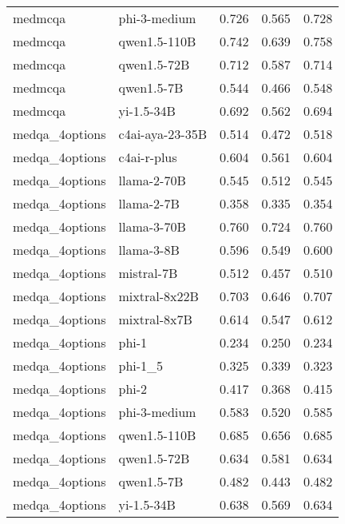 \begin{tabular}{llrrr}
medmcqa & phi-3-medium & 0.726 & 0.565 & 0.728 \\
medmcqa & qwen1.5-110B & 0.742 & 0.639 & 0.758 \\
medmcqa & qwen1.5-72B & 0.712 & 0.587 & 0.714 \\
medmcqa & qwen1.5-7B & 0.544 & 0.466 & 0.548 \\
medmcqa & yi-1.5-34B & 0.692 & 0.562 & 0.694 \\
medqa_4options & c4ai-aya-23-35B & 0.514 & 0.472 & 0.518 \\
medqa_4options & c4ai-r-plus & 0.604 & 0.561 & 0.604 \\
medqa_4options & llama-2-70B & 0.545 & 0.512 & 0.545 \\
medqa_4options & llama-2-7B & 0.358 & 0.335 & 0.354 \\
medqa_4options & llama-3-70B & 0.760 & 0.724 & 0.760 \\
medqa_4options & llama-3-8B & 0.596 & 0.549 & 0.600 \\
medqa_4options & mistral-7B & 0.512 & 0.457 & 0.510 \\
medqa_4options & mixtral-8x22B & 0.703 & 0.646 & 0.707 \\
medqa_4options & mixtral-8x7B & 0.614 & 0.547 & 0.612 \\
medqa_4options & phi-1 & 0.234 & 0.250 & 0.234 \\
medqa_4options & phi-1_5 & 0.325 & 0.339 & 0.323 \\
medqa_4options & phi-2 & 0.417 & 0.368 & 0.415 \\
medqa_4options & phi-3-medium & 0.583 & 0.520 & 0.585 \\
medqa_4options & qwen1.5-110B & 0.685 & 0.656 & 0.685 \\
medqa_4options & qwen1.5-72B & 0.634 & 0.581 & 0.634 \\
medqa_4options & qwen1.5-7B & 0.482 & 0.443 & 0.482 \\
medqa_4options & yi-1.5-34B & 0.638 & 0.569 & 0.634 \\
\bottomrule
\end{tabular}
